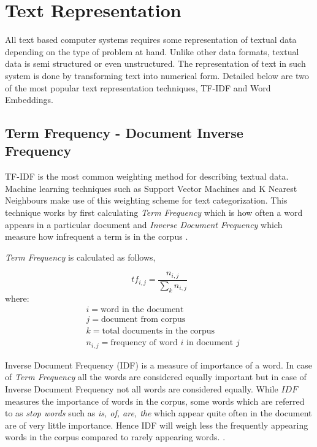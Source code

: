 \section{Text Representation}\label{backgroundTextRepresentation}

All text based computer systems requires some representation of textual data depending on the type of problem at hand. Unlike other data formats, textual data is semi structured or even unstructured. The representation of text in such system is done by transforming text into numerical form.  Detailed below are two of the most popular text representation techniques, TF-IDF and Word Embeddings.  

\subsection{Term Frequency - Document Inverse Frequency}
TF-IDF is the most common weighting method for describing textual data. Machine learning techniques such as Support Vector Machines and K Nearest Neighbours make use of this weighting scheme for text categorization. This technique works by first calculating \textit{Term Frequency} which is how often a word appears in a particular document and \textit{Inverse Document Frequency} which measure how infrequent a term is in the corpus \cite{soucy2005beyond}.

\textit{Term Frequency} is calculated as follows,

\begin{equation}\label{tf}
tf_{i,j} = \frac{n_{i,j}}{\sum_{k}n_{i,j}}
\end{equation}
where:
\begin{align*}
      & i=\text{word in the document}\\
      & j=\text{document from corpus}\\
      & k=\text{total documents in the corpus}      \\
      & n_{i,j}=\text{frequency of word $i$ in document $j$}      
\end{align*}                

Inverse Document Frequency (IDF) is a measure of importance of a word. In case of \textit{Term Frequency} all the words are considered equally important but in case of Inverse Document Frequency not all words are considered equally. While $IDF$ measures the importance of words in the corpus, some words which are referred to as \textit{stop words} such as \textit{is, of, are, the} which appear quite often in the document are of very little importance. Hence IDF will weigh less the frequently appearing words in the corpus compared to rarely appearing words. \cite{robertson2004understanding}. 


